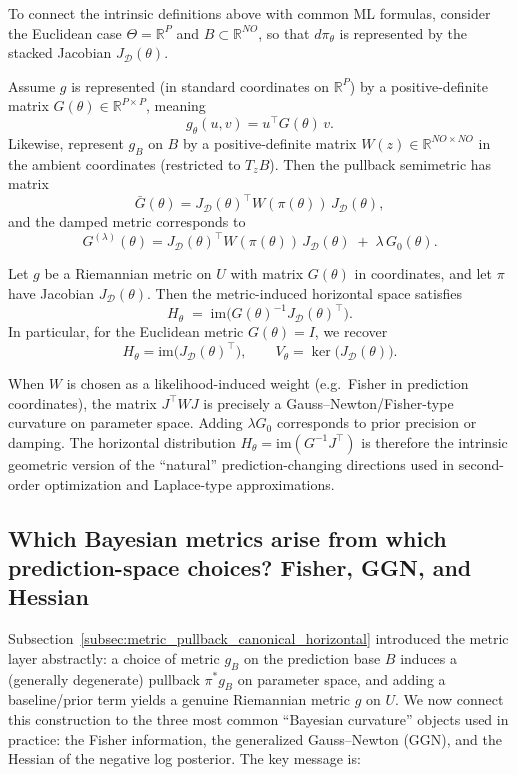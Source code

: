 To connect the intrinsic definitions above with common ML formulas, consider the Euclidean case
$\Theta=\mathbb R^P$ and $B\subset\mathbb R^{NO}$, so that $d\pi_\theta$ is represented by the stacked
Jacobian $J_{\mathcal D}(\theta)$.

Assume $g$ is represented (in standard coordinates on $\mathbb R^P$) by a positive-definite matrix
$G(\theta)\in\mathbb R^{P\times P}$, meaning
\[
g_\theta(u,v)=u^\top G(\theta)\,v.
\]
Likewise, represent $g_B$ on $B$ by a positive-definite matrix $W(z)\in\mathbb R^{NO\times NO}$ in the
ambient coordinates (restricted to $T_zB$).  Then the pullback semimetric has matrix
\[
\bar G(\theta)=J_{\mathcal D}(\theta)^\top W(\pi(\theta))\,J_{\mathcal D}(\theta),
\]
and the damped metric corresponds to
\[
G^{(\lambda)}(\theta)=J_{\mathcal D}(\theta)^\top W(\pi(\theta))\,J_{\mathcal D}(\theta)
\;+\;\lambda\,G_0(\theta).
\]

\begin{gprop}
\label{prop:horizontal_coordinates}
Let $g$ be a Riemannian metric on $U$ with matrix $G(\theta)$ in coordinates, and let $\pi$ have Jacobian
$J_{\mathcal D}(\theta)$.
Then the metric-induced horizontal space satisfies
\[
H_\theta
\;=\;
\mathrm{im}\!\bigl(G(\theta)^{-1} J_{\mathcal D}(\theta)^\top \bigr).
\]
In particular, for the Euclidean metric $G(\theta)=I$, we recover
\[
H_\theta=\mathrm{im}\!\bigl(J_{\mathcal D}(\theta)^\top\bigr),
\qquad
V_\theta=\ker\!\bigl(J_{\mathcal D}(\theta)\bigr).
\]
\end{gprop}

When $W$ is chosen as a likelihood-induced weight (e.g.\ Fisher in prediction coordinates),
the matrix $J^\top W J$ is precisely a Gauss--Newton/Fisher-type curvature on parameter space.
Adding $\lambda G_0$ corresponds to prior precision or damping.  The horizontal distribution
$H_\theta=\mathrm{im}(G^{-1}J^\top)$ is therefore the intrinsic geometric version of the
``natural'' prediction-changing directions used in second-order optimization and Laplace-type
approximations.

\subsection{Which Bayesian metrics arise from which prediction-space choices? Fisher, GGN, and Hessian}
\label{subsec:which_metrics_fisher_ggn_hessian}

Subsection~\ref{subsec:metric_pullback_canonical_horizontal} introduced the metric layer abstractly:
a choice of metric $g_B$ on the prediction base $B$ induces a (generally degenerate) pullback
$\pi^\ast g_B$ on parameter space, and adding a baseline/prior term yields a genuine Riemannian
metric $g$ on $U$.  We now connect this construction to the three most common ``Bayesian curvature''
objects used in practice: the Fisher information, the generalized Gauss--Newton (GGN), and the Hessian
of the negative log posterior.  The key message is:

